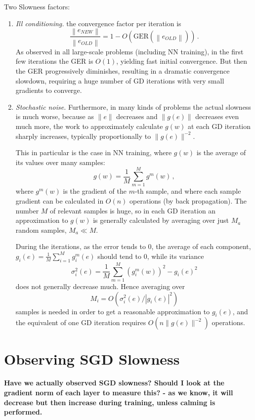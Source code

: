 \documentclass[11pt]{article}
\newcommand{\ger}{{\mbox{GER}}}
\begin{document}
Two Slowness factors:
\begin{enumerate}
    \item {\it Ill conditioning.} the convergence factor per iteration is
$$
	\frac{\left\|e_{NEW}\right\|}{\left\|e_{OLD}\right\|} = 1 - O\left(\ger\left(\left\|e_{OLD}\right\|\right)\right)\,.
$$
As observed in all large-scale problems (including NN training), in the first few iterations the GER is $O(1)$, yielding fast initial convergence. But then the GER progressively diminishes, resulting in a dramatic convergence slowdown, requiring a huge number of GD iterations with very small gradients to converge.

\item {\it Stochastic noise.} Furthermore, in many kinds of problems the actual slowness is much worse, because as $\|e\|$ decreases and $\|g(e)\|$ decreases even much more, the work to approximately calculate $g(w)$ at each GD iteration sharply increases, typically proportionally to $\|g(e)\|^{-2}$.

This in particular is the case in NN training, where $g(w)$ is the average of its values over many samples:
$$
	g(w) = \frac{1}{M} \sum_{m=1}^M g^m(w)\,,
$$
where $g^m(w)$ is the gradient of the $m$-th sample, and where each sample gradient can be calculated in $O(n)$ operations (by back propagation). The number $M$ of relevant samples is huge, so in each GD iteration an approximation to $g(w)$ is generally calculated by averaging over just $M_a$ random samples, $M_a \ll M$.

During the iterations, as the error tends to $0$, the average of each component, $g_i(e) = \frac{1}{M} \sum_{i=1}^M g_i^m(e)$ should tend to $0$, while its variance
$$
	\sigma_i^2(e) =  \frac{1}{M} \sum_{m=1}^M \left(g_i^m(w)\right)^2 - g_i(e)^2
$$
does not generally decrease much. Hence averaging over $$M_i = O(\sigma_i^2(e) / |g_i(e)|^2)$$ samples is needed in order to get a reasonable approximation to $g_i(e)$, and the equivalent of one GD iteration requires $O(n\|g(e)\|^{-2})$ operations.
\end{enumerate}


\section{Observing SGD Slowness}
{\bf Have we actually observed SGD slowness? Should I look at the gradient norm of each layer to measure this? - as we know, it will decrease but then increase during training, unless calming is performed.}
\end{document}
